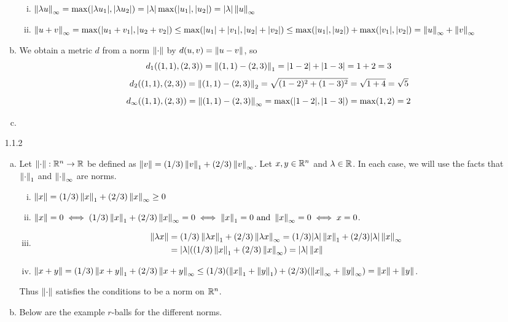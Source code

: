 \documentclass[../../Solutions.tex]{subfiles}
\begin{document}
\begin{itemize}
\begin{enumerate}[(a)]
\begin{enumerate}[(i)]
					\item $\left\lVert\lambda u\right\rVert_\infty = \max(|\lambda u_1|,|\lambda u_2|) = |\lambda|\max(|u_1|,|u_2|) = |\lambda|\left\lVert u\right\rVert_\infty$
					\item $\left\lVert u+v\right\rVert_\infty = \max(|u_1+v_1|,|u_2+v_2|) \leq \max(|u_1|+|v_1|,|u_2|+|v_2|) \leq \max(|u_1|,|u_2|)+\max(|v_1|,|v_2|) = \left\lVert u\right\rVert_\infty+\left\lVert v\right\rVert_\infty$
				\end{enumerate}
			\item We obtain a metric $d$ from a norm $\left\lVert\cdot\right\rVert$ by $d(u,v) = \left\lVert u-v\right\rVert$, so
				$$ d_1((1,1),(2,3)) = \left\lVert(1,1)-(2,3)\right\rVert_1 = |1-2|+|1-3| = 1+2 = 3 $$
				$$ d_2((1,1),(2,3)) = \left\lVert(1,1)-(2,3)\right\rVert_2 = \sqrt{(1-2)^2+(1-3)^2} = \sqrt{1+4} = \sqrt{5} $$
				$$ d_\infty((1,1),(2,3)) = \left\lVert(1,1)-(2,3)\right\rVert_\infty = \max(|1-2|,|1-3|) = \max(1,2) = 2 $$
			\item %
		\end{enumerate}
	
	\item [1.1.2]
		\begin{enumerate}[(a)]
			\item Let $\left\lVert\cdot\right\rVert:\mathbb{R}^n \to \mathbb{R}$ be defined as $\left\lVert v\right\rVert = (1/3)\left\lVert v\right\rVert_1+(2/3)\left\lVert v\right\rVert_\infty$.
				Let $x,y \in \mathbb{R}^n$ and $\lambda \in \mathbb{R}$.
				In each case, we will use the facts that $\left\lVert\cdot\right\rVert_1$ and $\left\lVert\cdot\right\rVert_\infty$ are norms.
				
				\begin{enumerate}[(i)]
					\item $\left\lVert x\right\rVert = (1/3)\left\lVert x\right\rVert_1+(2/3)\left\lVert x\right\rVert_\infty \geq 0$
					\item $\left\lVert x\right\rVert = 0 \iff (1/3)\left\lVert x\right\rVert_1+(2/3)\left\lVert x\right\rVert_\infty = 0 \iff \left\lVert x\right\rVert_1 = 0 \text{ and } \left\lVert x\right\rVert_\infty = 0 \iff x = 0$.
					\item \begin{equation*} \begin{split}
						 \left\lVert\lambda x\right\rVert & = (1/3)\left\lVert\lambda x\right\rVert_1+(2/3)\left\lVert\lambda x\right\rVert_\infty = (1/3)|\lambda|\left\lVert x\right\rVert_1+(2/3)|\lambda|\left\lVert x\right\rVert_\infty \\
							 & = |\lambda|((1/3)\left\lVert x\right\rVert_1+(2/3)\left\lVert x\right\rVert_\infty) = |\lambda|\left\lVert x\right\rVert
					\end{split} \end{equation*}
					\item $\left\lVert x+y\right\rVert = (1/3)\left\lVert x+y\right\rVert_1+(2/3)\left\lVert x+y\right\rVert_\infty \leq (1/3)(\left\lVert x\right\rVert_1+\left\lVert y\right\rVert_1)+(2/3)(\left\lVert x\right\rVert_\infty+\left\lVert y\right\rVert_\infty) = \left\lVert x\right\rVert+\left\lVert y\right\rVert$.
				\end{enumerate}
				Thus $\left\lVert\cdot\right\rVert$ satisfies the conditions to be a norm on $\mathbb{R}^n$.
			\item Below are the example $r$-balls for the different norms.
				\begin{figure}[h]
					\begin{center}
						
					\end{center}
				\end{figure}
		\end{enumerate}
	

\end{itemize}
\end{document}
